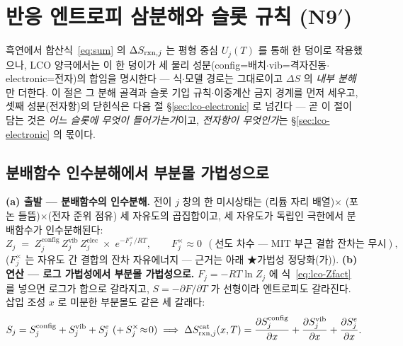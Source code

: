 \section{반응 엔트로피 삼분해와 슬롯 규칙 (N9$'$)}\label{sec:lco-decomp}
흑연에서 합산식~\eqref{eq:sum} 의 $\Delta S_{\mathrm{rxn},j}$ 는 평형 중심 $U_j(T)$ 를 통해 한 덩이로 작용했으나, LCO 양극에서는 이 한 덩이가 세 물리 성분(config=배치$\cdot$vib=격자진동$\cdot$electronic=전자)의 합임을 명시한다 --- 식$\cdot$모델 경로는 그대로이고 $\Delta S$ 의 \emph{내부 분해}만 더한다. 이 절은 그 분해 골격과 슬롯 기입 규칙$\cdot$이중계산 금지 경계를 먼저 세우고, 셋째 성분(전자항)의 닫힌식은 다음 절 \S\ref{sec:lco-electronic} 로 넘긴다 --- 곧 이 절이 담는 것은 \emph{어느 슬롯에 무엇이 들어가는가}이고, \emph{전자항이 무엇인가}는 \S\ref{sec:lco-electronic} 의 몫이다.

\subsection{분배함수 인수분해에서 부분몰 가법성으로}\label{sec:lco-decomp-add}
\textbf{(a) 출발 --- 분배함수의 인수분해.} 전이 $j$ 창의 한 미시상태는 (리튬 자리 배열)$\times$
(포논 들뜸)$\times$(전자 준위 점유) 세 자유도의 곱집합이고, 세 자유도가 독립인 극한에서 분배함수가
인수분해된다:
\begin{equation}
Z_j\;=\;Z_j^\mathrm{config}\,Z_j^\mathrm{vib}\,Z_j^\mathrm{elec}\;\times\;e^{-F_j^{\times}/RT},
\qquad F_j^{\times}\approx0\ \ (\text{선도 차수 --- MIT 부근 결합 잔차는 무시}),
\label{eq:lco-Zfact}
\end{equation}
($F_j^{\times}$ 는 자유도 간 결합의 잔차 자유에너지 --- 근거는 아래 ★가법성 정당화(가)). \textbf{(b) 연산 --- 로그
가법성에서 부분몰 가법성으로.} $F_j=-RT\ln Z_j$ 에 식~\eqref{eq:lco-Zfact} 를 넣으면 로그가 합으로
갈라지고, $S=-\partial F/\partial T$ 가 선형이라 엔트로피도 갈라진다. 삽입 조성 $x$ 로 미분한 부분몰도
같은 세 갈래다:
\begin{equation}
S_j=S_j^\mathrm{config}+S_j^\mathrm{vib}+S_j^{e}\ (+\,S_j^{\times}\!\approx\!0)
\;\Longrightarrow\;
\Delta S_{\rxn,j}^\mathrm{cat}(x,T)=\frac{\partial S_j^\mathrm{config}}{\partial x}
+\frac{\partial S_j^\mathrm{vib}}{\partial x}
+\frac{\partial S_j^{e}}{\partial x}.
\label{eq:lco-Sadd}
\end{equation}

